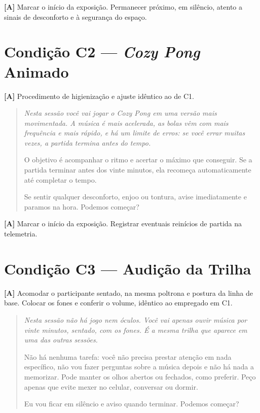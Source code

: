 \noindent\textbf{[A]} Marcar o início da exposição. Permanecer próximo, em silêncio, atento a sinais de desconforto e à segurança do espaço.

\section{Condição C2 --- \textit{Cozy Pong} Animado}

\noindent\textbf{[A]} Procedimento de higienização e ajuste idêntico ao de C1.

\begin{quote}\itshape
Nesta sessão você vai jogar o \textit{Cozy Pong} em uma versão mais movimentada. A música é mais acelerada, as bolas vêm com mais frequência e mais rápido, e há um limite de erros: se você errar muitas vezes, a partida termina antes do tempo.

O objetivo é acompanhar o ritmo e acertar o máximo que conseguir. Se a partida terminar antes dos vinte minutos, ela recomeça automaticamente até completar o tempo.

Se sentir qualquer desconforto, enjoo ou tontura, avise imediatamente e paramos na hora. Podemos começar?
\end{quote}

\noindent\textbf{[A]} Marcar o início da exposição. Registrar eventuais reinícios de partida na telemetria.

\section{Condição C3 --- Audição da Trilha}

\noindent\textbf{[A]} Acomodar o participante sentado, na mesma poltrona e postura da linha de base. Colocar os fones e conferir o volume, idêntico ao empregado em C1.

\begin{quote}\itshape
Nesta sessão não há jogo nem óculos. Você vai apenas ouvir música por vinte minutos, sentado, com os fones. É a mesma trilha que aparece em uma das outras sessões.

Não há nenhuma tarefa: você não precisa prestar atenção em nada específico, não vou fazer perguntas sobre a música depois e não há nada a memorizar. Pode manter os olhos abertos ou fechados, como preferir. Peço apenas que evite mexer no celular, conversar ou dormir.

Eu vou ficar em silêncio e aviso quando terminar. Podemos começar?
\end{quote}


